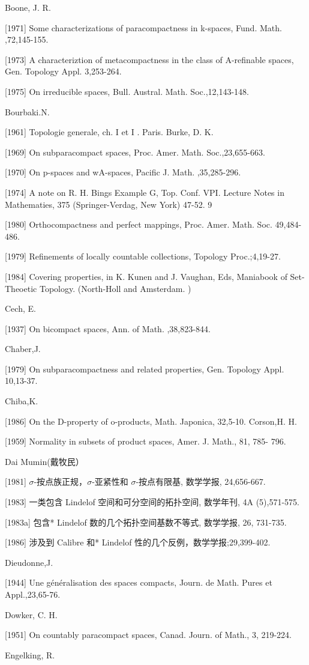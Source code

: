 \documentclass[main.tex]{subfiles}
\begin{document}
Boone, J. R.

[1971]
Some characterizations of paracompactness in k-spaces, Fund.
Math. ,72,145-155.

[1973] A characteriztion of metacompactness in the class of A-refinable
spaces, Gen. Topology Appl. 3,253-264.

[1975] On irreducible spaces, Bull. Austral. Math. Soc.,12,143-148.

\noindent Bourbaki.N.

[1961] Topologie generale, ch. I et I . Paris.
Burke, D. K.

[1969] On subparacompact spaces, Proc. Amer. Math. Soc.,23,655-663.

[1970] On p-spaces and wA-spaces, Pacific J. Math. ,35,285-296.

[1974] A note on R. H. Bings Example G, Top. Conf. VPI. Lecture Notes in
Mathematies, 375 (Springer-Verdag, New York) 47-52. 9

[1980] Orthocompactness and perfect mappings, Proc. Amer. Math. Soc.
49,484-486.

[1979] Refinements of locally countable collections, Topology Proc.;4,19-27.

[1984] Covering properties, in  K. Kunen and J. Vaughan, Eds, Maniabook of Set-Theoetic Topology. (North-Holl and Amsterdam. )

\noindent Cech, E.

[1937] On bicompact spaces, Ann. of Math. ,38,823-844.

\noindent Chaber,J.

[1979] On subparacompactness and related properties, Gen. Topology Appl.
10,13-37.

\noindent Chiba,K.

[1986] On the D-property of o-products, Math. Japonica, 32,5-10.
Corson,H. H.

[1959] Normality in subsets of product spaces, Amer. J. Math., 81, 785-
796.

\noindent Dai Mumin(戴牧民）

[1981] $\sigma$-按点族正规，$\sigma$-亚紧性和 $\sigma$-按点有限基, 数学学报, 24,656-667.

[1983] 一类包含 Lindelof 空间和可分空间的拓扑空间, 数学年刊, 4A
(5),571-575.

[1983a] 包含* Lindelof 数的几个拓扑空间基数不等式, 数学学报, 26, 731-735.

[1986] 涉及到 Calibre 和* Lindelof 性的几个反例，数学学报;29,399-402.

\noindent Dieudonne,J.

[1944] Une généralisation des spaces compacts, Journ. de Math. Pures et Appl.,23,65-76.

\noindent Dowker, C. H.

[1951] On countably paracompact spaces, Canad. Journ. of Math., 3, 219-224.

\noindent Engelking, R.

	
\end{document}
